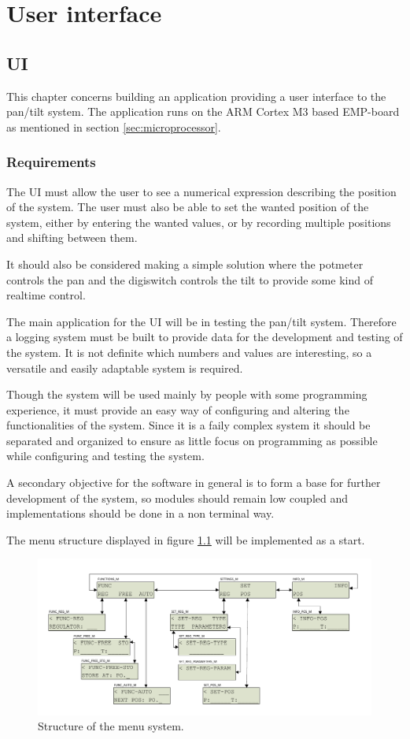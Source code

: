 \chapter{User interface}\label{chap:ui}

\section{UI}
This chapter concerns building an application providing a user interface to the
pan/tilt system. The application runs on the ARM Cortex M3 based EMP-board
as mentioned in section \ref{sec:microprocessor}.

\subsection{Requirements}
The UI must allow the user to see a numerical expression
describing the position of the system. The user must also be able to set the
wanted position of the system, either by entering the wanted values, or by
recording multiple positions and shifting between them.

It should also be considered making a simple solution where the potmeter
controls the pan and the digiswitch controls the tilt to provide some kind of
realtime control.

The main application for the UI will be in testing the pan/tilt system.
Therefore a logging system must be built to provide data for the development
and testing of the system. It is not definite which numbers and values are
interesting, so a versatile and easily adaptable system is required.

Though the system will be used mainly by people with some programming
experience, it must provide an easy way of configuring and altering the functionalities of the system. Since it is a faily complex system it should be separated and organized to ensure as little focus on programming as possible while configuring and testing the system.

A secondary objective for the software in general is to form a base for further development of the system, so modules should remain low coupled and implementations should be done in a non terminal way.

The  menu structure displayed in figure \ref{fig:ui_menu_structure} will be implemented as a start.

\begin{figure}[htb]
	\centering
	\includegraphics[width=\textwidth,clip,trim=10 15 10 15]{graphics/menu_structure.pdf} 
	\caption{Structure of the menu system.}
	\label{fig:ui_menu_structure}
\end{figure}

